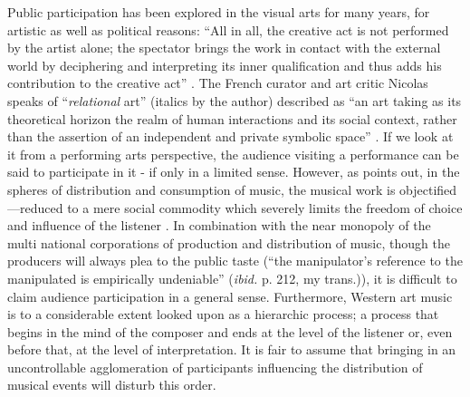 Public participation has been explored in the visual arts for many years, for artistic as well as political reasons: ``All in all, the creative act is not performed by the artist alone; the spectator brings the work in contact with the external world by deciphering and interpreting its inner qualification and thus adds his contribution to the creative act'' \citep{duchamps57}. The French curator and art critic Nicolas \citeauthor{bourriaud} speaks of ``\textit{relational} art'' (italics by the author) described as ``an art taking as its theoretical horizon the realm of human interactions and its social context, rather than the assertion of an independent and private symbolic space'' \citep[p. 13]{bourriaud}. 
If we look at it from a performing arts perspective, the audience visiting a performance can be said to participate in it - if only in a limited sense. However, as \citeauthor{adorno} points out, in the spheres of distribution and consumption of music, the musical work is objectified---reduced to a mere social commodity which severely limits the freedom of choice and influence of the listener \citep[p. 211]{adorno}. In combination with the near monopoly of the multi national corporations of production and distribution of music, though the producers will always plea to the public taste (``the manipulator's reference to the manipulated is empirically undeniable'' (\textit{ibid.} p. 212, my trans.)), it is difficult to claim audience participation in a general sense. Furthermore, Western art music is to a considerable extent looked upon as a hierarchic process; a process that begins in the mind of the composer and ends at the level of the listener or, even before that, at the level of interpretation. It is fair to assume that bringing in an uncontrollable agglomeration of participants influencing the distribution of musical events will disturb this order. 

